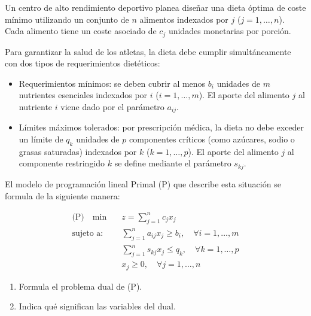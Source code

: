 Un centro de alto rendimiento deportivo planea diseñar una dieta óptima de coste mínimo utilizando un conjunto de $n$ alimentos indexados por $j$ ($j = 1, \dots, n$). Cada alimento tiene un coste asociado de $c_j$ unidades monetarias por porción. 

Para garantizar la salud de los atletas, la dieta debe cumplir simultáneamente con dos tipos de requerimientos dietéticos:
\begin{itemize}
    \item Requerimientos mínimos: se deben cubrir al menos $b_i$ unidades de $m$ nutrientes esenciales indexados por $i$ ($i = 1, \dots, m$). El aporte del alimento $j$ al nutriente $i$ viene dado por el parámetro $a_{ij}$.
    \item Límites máximos tolerados: por prescripción médica, la dieta no debe exceder un límite de $q_k$ unidades de $p$ componentes críticos (como azúcares, sodio o grasas saturadas) indexados por $k$ ($k = 1, \dots, p$). El aporte del alimento $j$ al componente restringido $k$ se define mediante el parámetro $s_{kj}$.
\end{itemize}

El modelo de programación lineal Primal (P) que describe esta situación se formula de la siguiente manera:

\begin{align*}
\text{(P)} \quad \min \quad & z = \sum_{j=1}^{n} c_j x_j \\
\text{sujeto a:} \quad & \sum_{j=1}^{n} a_{ij} x_j \ge b_i, \quad \forall i = 1, \dots, m \\
& \sum_{j=1}^{n} s_{kj} x_j \le q_k, \quad \forall k = 1, \dots, p \\
& x_j \ge 0, \quad \forall j = 1, \dots, n
\end{align*}

\begin{enumerate}
    \item Formula el problema dual de (P).
    \item Indica qué significan las variables del dual.
\end{enumerate}